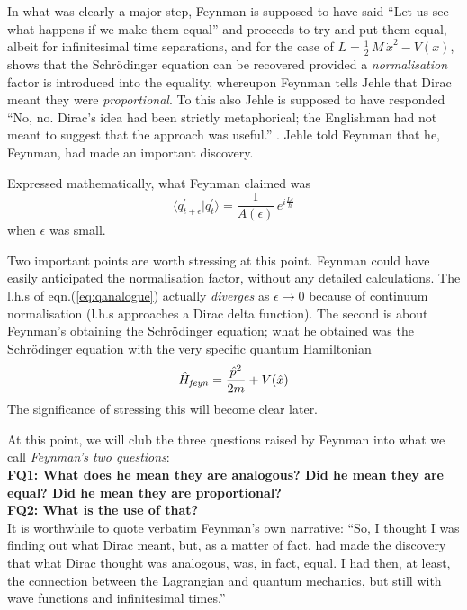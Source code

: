 \documentclass[12pt]{article}
\newcommand{\be}{\begin{equation}}
\newcommand{\ee}{\end{equation}}
\begin{document}
In what was clearly a major step, Feynman is supposed to have said ``Let us see what happens if we make them equal'' and proceeds to try 
and put them equal, albeit for infinitesimal time separations, and
for the case of $L = \frac{1}{2}\,M\,{\dot x}^2 - V(x)$, shows that the Schr\"odinger equation can be recovered provided a 
{\it normalisation} factor is introduced into the equality, whereupon Feynman tells Jehle that Dirac meant they were {\it proportional}. To
this also Jehle is supposed to have responded ``No, no. Dirac's idea had been strictly metaphorical; the Englishman had not meant to
suggest that the approach was useful.'' \cite{gleick}. Jehle told Feynman that he, Feynman, had made an important discovery.

Expressed mathematically, what Feynman claimed was
\be
\label{eq:missinglink0}
\langle q_{t + \epsilon}^\prime|q_t^\prime\rangle = \frac{1}{A(\epsilon)}\,e^{i \frac{L \epsilon}{\hbar}}
\ee
when $\epsilon$ was small.


Two important points are worth stressing at this point. Feynman could have easily anticipated the normalisation factor, without any
detailed calculations. The l.h.s of eqn.(\ref{eq:qanalogue}) actually \emph{diverges} as $\epsilon \rightarrow 0$ because of continuum 
normalisation (l.h.s approaches a Dirac delta function). The second is about Feynman's obtaining the Schr\"odinger equation; what he obtained
was the Schr\"odinger equation with the very specific quantum Hamiltonian
\be
\label{eq:feynHq}
{\hat H}_{\it feyn} = \frac{{\hat p}^2}{2m} + V({\hat x})
\ee
The significance of stressing this will become clear later.

At this point, we will club the three questions raised by Feynman into what we call \emph{Feynman's two questions}:\\
{\bf FQ1: What does he mean they are analogous? Did he mean they are equal? Did he mean they are proportional?}\\
{\bf FQ2: What is the use of that?}\\

It is worthwhile to quote verbatim Feynman's own narrative: ``So, I thought I was finding out what Dirac meant, but, as a matter of fact, 
had made the discovery that what Dirac thought was analogous, was, in fact, equal. I had then, at least, the connection between the 
Lagrangian and quantum mechanics, but still with wave functions and infinitesimal times.'' \cite{nobel}
\end{document}
